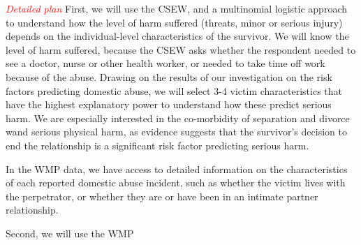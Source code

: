 \documentclass[11pt, a4paper]{article}
\begin{document}
\textcolor{red}{\textit{Detailed plan}} First, we will use the CSEW, and a multinomial logistic approach to understand how the level of harm suffered (threats, minor or serious injury) depends on the individual-level characteristics of the survivor. We will know the level of harm suffered, because the CSEW asks whether the respondent needed to see a doctor, nurse or other health worker, or needed to take time off work because of the abuse.  Drawing on the results of our investigation on the risk factors predicting domestic abuse, we will select 3-4 victim characteristics that have the highest explanatory power to understand how these predict serious harm. We are especially interested in the co-morbidity of separation and divorce wand serious physical harm, as evidence suggests that the survivor's decision to end the relationship is a significant risk factor predicting serious harm. 

In the WMP data, we have access to detailed information on the characteristics of each reported domestic abuse incident, such as whether the victim lives with the perpetrator, or whether they are or have been in an intimate partner relationship. 


Second, we will use the WMP 
\end{document}
